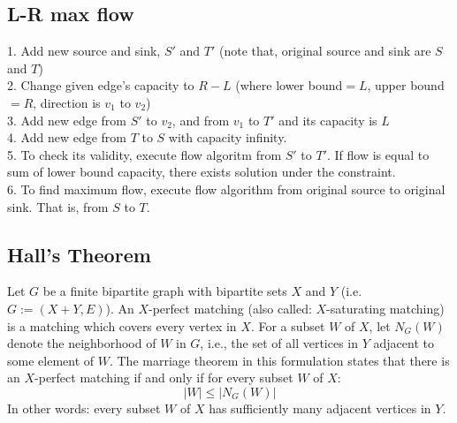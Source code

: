 	\subsection{L-R max flow}
		1. Add new source and sink, $S'$ and $T'$ (note that, original source and sink are $S$ and $T$) \\
		2. Change given edge's capacity to $R-L$ (where lower bound$=L$, upper bound$=R$, direction is $v_1$ to $v_2$) \\
		3. Add new edge from $S'$ to $v_2$, and from $v_1$ to $T'$ and its capacity is $L$ \\
		4. Add new edge from $T$ to $S$ with capacity infinity. \\
		5. To check its validity, execute flow algoritm from $S'$ to $T'$. If flow is equal to sum of lower bound capacity, there exists solution under the constraint. \\
		6. To find maximum flow, execute flow algorithm from original source to original sink. That is, from $S$ to $T$. \\
	\subsection{Hall's Theorem}
		Let $G$ be a finite bipartite graph with bipartite sets $X$ and $Y$ (i.e. $G := (X+Y, E)$). 
		An $X$-perfect matching (also called: $X$-saturating matching) is a matching which covers every vertex in $X$. 
		For a subset $W$ of $X$, let $N_{G}(W)$ denote the neighborhood of $W$ in $G$, i.e., the set of all vertices in $Y$ adjacent to some element of $W$. 
		The marriage theorem in this formulation states that there is an $X$-perfect matching if and only if for every subset $W$ of $X$:
		$$|W|\le{}|N_{G}(W)|$$
		In other words: every subset $W$ of $X$ has sufficiently many adjacent vertices in $Y$.


